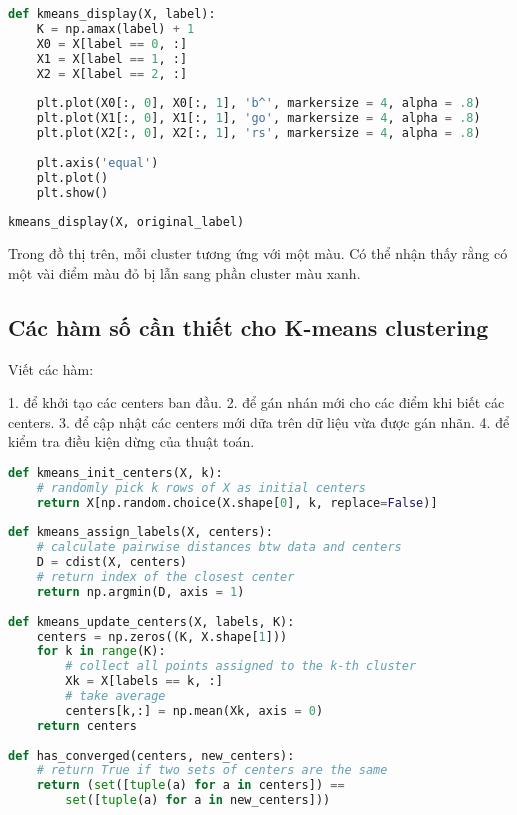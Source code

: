  
\begin{lstlisting}[language=Python]
def kmeans_display(X, label): 
    K = np.amax(label) + 1 
    X0 = X[label == 0, :] 
    X1 = X[label == 1, :] 
    X2 = X[label == 2, :] 
     
    plt.plot(X0[:, 0], X0[:, 1], 'b^', markersize = 4, alpha = .8) 
    plt.plot(X1[:, 0], X1[:, 1], 'go', markersize = 4, alpha = .8) 
    plt.plot(X2[:, 0], X2[:, 1], 'rs', markersize = 4, alpha = .8) 
 
    plt.axis('equal') 
    plt.plot() 
    plt.show() 
     
kmeans_display(X, original_label) 
\end{lstlisting}
 
 
Trong đồ thị trên, mỗi cluster tương ứng với một màu. Có thể nhận thấy rằng có một vài điểm màu đỏ bị lẫn sang phần cluster màu xanh. 
 
\subsection{Các hàm số cần thiết cho K-means clustering }
Viết các hàm: 
 
1.  để khởi tạo các centers ban đầu. 
2.  để gán nhán mới cho các điểm khi biết các centers. 
3.  để cập nhật các centers mới dữa trên dữ liệu vừa được gán nhãn. 
4.  để kiểm tra điều kiện dừng của thuật toán. 
 
 
\begin{lstlisting}[language=Python]
def kmeans_init_centers(X, k): 
    # randomly pick k rows of X as initial centers 
    return X[np.random.choice(X.shape[0], k, replace=False)] 
 
def kmeans_assign_labels(X, centers): 
    # calculate pairwise distances btw data and centers 
    D = cdist(X, centers) 
    # return index of the closest center 
    return np.argmin(D, axis = 1) 
 
def kmeans_update_centers(X, labels, K): 
    centers = np.zeros((K, X.shape[1])) 
    for k in range(K): 
        # collect all points assigned to the k-th cluster  
        Xk = X[labels == k, :] 
        # take average 
        centers[k,:] = np.mean(Xk, axis = 0) 
    return centers 
 
def has_converged(centers, new_centers): 
    # return True if two sets of centers are the same 
    return (set([tuple(a) for a in centers]) ==  
        set([tuple(a) for a in new_centers])) 
\end{lstlisting}
 
